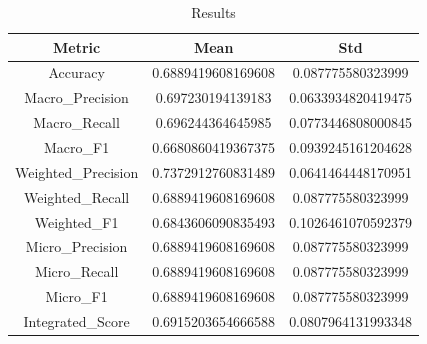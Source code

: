 \begin{table}[htbp]
\centering
\caption{Results}
\label{tab:csv}
\small
\setlength{\tabcolsep}{4pt}
\begin{tabular}{|c|c|c|}
\hline
Metric & Mean & Std \\
\hline
Accuracy & 0.6889419608169608 & 0.087775580323999 \\
Macro_Precision & 0.697230194139183 & 0.0633934820419475 \\
Macro_Recall & 0.696244364645985 & 0.0773446808000845 \\
Macro_F1 & 0.6680860419367375 & 0.0939245161204628 \\
Weighted_Precision & 0.7372912760831489 & 0.0641464448170951 \\
Weighted_Recall & 0.6889419608169608 & 0.087775580323999 \\
Weighted_F1 & 0.6843606090835493 & 0.1026461070592379 \\
Micro_Precision & 0.6889419608169608 & 0.087775580323999 \\
Micro_Recall & 0.6889419608169608 & 0.087775580323999 \\
Micro_F1 & 0.6889419608169608 & 0.087775580323999 \\
Integrated_Score & 0.6915203654666588 & 0.0807964131993348 \\
\hline
\end{tabular}
\end{table}